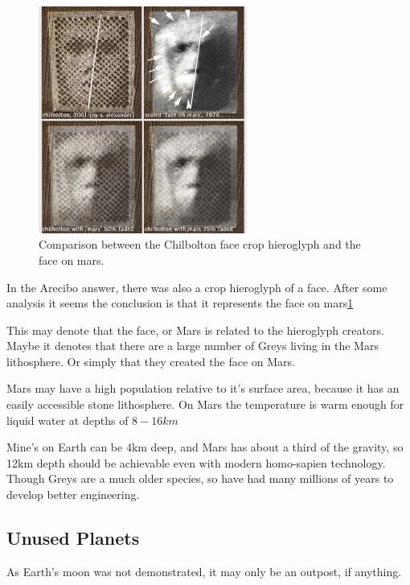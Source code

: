 \documentclass{report}
\begin{document}
\begin{figure}
  \centering
  \includegraphics[width=0.61\textwidth]{photograph/chilbolton_mars_face.jpg}
  \caption{Comparison between the Chilbolton face crop hieroglyph and the face on
mars.}
\label{fig:marsface}
\end{figure}

In the Arecibo answer, there was also a crop hieroglyph of a face. After some
analysis it seems the conclusion is that it represents the face on
mars\ref{fig:marsface}\cite{chilbolton}

This may denote that the face, or Mars is related to the hieroglyph creators.
Maybe it denotes that there are a large number of Greys living in the Mars
lithosphere. Or simply that they created the face on Mars. 

Mars may have a high population relative to it's surface area, 
because it has an easily accessible stone lithosphere. On Mars the temperature
is warm enough for liquid water at depths of $8-16km$\cite{marswater}

Mine's on Earth can be 4km deep, and Mars has about a third of the gravity, so
12km depth should be achievable even with modern homo-sapien technology. Though
Greys are a much older species, so have had many millions of years to develop
better engineering.



\subsection{Unused Planets}

As Earth's moon was not demonstrated, it may only be an outpost, if anything.
\end{document}

